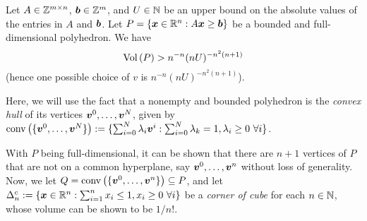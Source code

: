 \begin{enumerate}
\begin{proposition}
\label{prp:bdd-full-d-polyhedron-v}
Let \(A\in\mathbb{Z}^{m\times n}\), \(\bm{b}\in \mathbb{Z}^{m}\), and \(U\in\mathbb{N}\) be an upper
bound on the absolute values of the entries in \(A\) and \(\bm{b}\). Let
\(P=\{\bm{x}\in\mathbb{R}^n:A\bm{x}\ge\bm{b}\}\) be a bounded and
full-dimensional polyhedron. We have
\[
\operatorname{Vol}\left(P\right)>n^{-n}(nU)^{-n^{2}(n+1)}
\]
(hence one possible choice of \(v\) is \(n^{-n}(nU)^{-n^{2}(n+1)}\)).
\end{proposition}
\begin{pf}
Here, we will use the fact that a nonempty and bounded polyhedron is the
\emph{convex hull} of its vertices \(\bm{v}^{0},\dotsc,\bm{v}^{N}\), given
by \(\operatorname{conv}\left(\{\bm{v}^{0},\dotsc,\bm{v}^{N}\}\right)
:=\{\sum_{i=0}^{N}\lambda_{i}\bm{v}^{i}:\sum_{i=0}^{N}\lambda_k=1,
\lambda_i\ge 0~\forall i\}\).

With \(P\) being full-dimensional, it can be shown that there are \(n+1\)
vertices of \(P\) that are not on a common hyperplane, say
\(\bm{v}^{0},\dotsc,\bm{v}^{n}\) without loss of generality. Now, we let
\(Q=\operatorname{conv}\left(\{\bm{v}^{0},\dotsc,\bm{v}^{n}\}\right)\subseteq P\), 
and let \(\Delta_n^c:=\{\bm{x}\in\mathbb{R}^n:\sum_{i=1}^{n}x_i\le 1, x_i\ge
0~\forall i\}\) be a \emph{corner of cube} for each \(n\in\mathbb{N}\), whose volume
can be shown to be \(1/n!\).
\begin{center}
\end{center}
\end{pf}
\end{enumerate}
